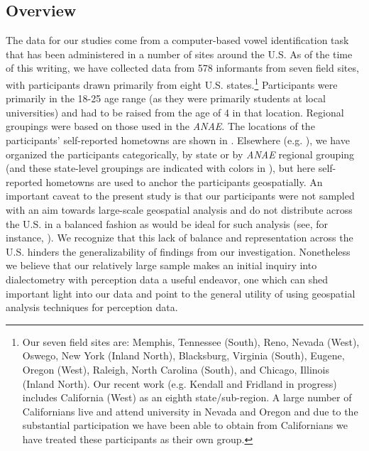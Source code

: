 \documentclass[output=paper]{LSP/langsci}
\begin{document}
\subsection{Overview}
The data for our studies come from a computer-based vowel identification task that has been administered in a number of sites around the U.S. As of the time of this writing, we have collected data from 578 informants from seven field sites, with participants drawn primarily from eight U.S. states.\footnote{Our seven field sites are: Memphis, Tennessee (South), Reno, Nevada (West), Oswego, New York (Inland North), Blacksburg, Virginia (South), Eugene, Oregon (West), Raleigh, North Carolina (South), and Chicago, Illinois (Inland North). Our recent work (e.g. Kendall and Fridland in progress) includes California (West) as an eighth state/sub-region. A large number of Californians live and attend university in Nevada and Oregon and due to the substantial participation we have been able to obtain from Californians we have treated these participants as their own group.} Participants were primarily in the 18-25 age range (as they were primarily students at local universities) and had to be raised from the age of 4 in that location. Regional groupings were based on those used in the \textit{ANAE}. The locations of the participants’ self-reported hometowns are shown in . Elsewhere (e.g. \citealt{fridland_exploring_2012}), we have organized the participants categorically, by state or by \textit{ANAE} regional grouping (and these state-level groupings are indicated with colors in ), but here self-reported hometowns are used to anchor the participants geospatially. An important caveat to the present study is that our participants were not sampled with an aim towards large-scale geospatial analysis and do not distribute across the U.S. in a balanced fashion as would be ideal for such analysis (see, for instance, \citealt{grieve_corpus-based_2009}). We recognize that this lack of balance and representation across the U.S. hinders the generalizability of findings from our investigation. Nonetheless we believe that our relatively large sample makes an initial inquiry into dialectometry with perception data a useful endeavor, one which can shed important light into our data and point to the general utility of using geospatial analysis techniques for perception data.
\end{document}
